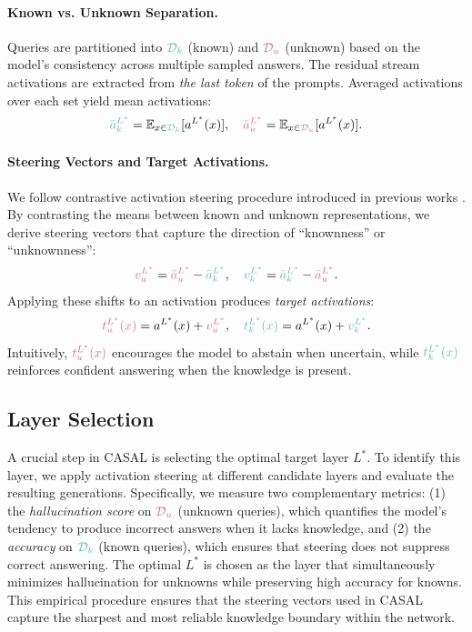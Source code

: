 \documentclass{article} %
\newcommand{\known}[1]{\textcolor{KnownGreen}{#1}}
\newcommand{\unknown}[1]{\textcolor{UnknownRed}{#1}}
\begin{document}
\paragraph{Known vs. Unknown Separation.}  
Queries are partitioned into $\known{\mathcal{D}_k}$ (\known{known}) and $\unknown{\mathcal{D}_u}$ (\unknown{unknown}) based on the model’s consistency across multiple sampled answers. The residual stream activations are extracted from \textit{the last token} of the prompts. Averaged activations over each set yield mean activations:
\[
\known{\bar{a}^{L^*}_k} = \mathbb{E}_{x \in \known{\mathcal{D}_k}}[a^{L^*}(x)], \quad 
\unknown{\bar{a}^{L^*}_u} = \mathbb{E}_{x \in \unknown{\mathcal{D}_u}}[a^{L^*}(x)] .
\]  

\paragraph{Steering Vectors and Target Activations.}  
\label{para: steering and target}
We follow contrastive activation steering procedure introduced in previous works \citep{arditi2024refusal}. By contrasting the means between known and unknown representations, we derive steering vectors that capture the direction of \known{``knownness''} or \unknown{``unknownness''}:
\[
\unknown{v^{L^*}_u} = \unknown{\bar{a}^{L^*}_u} - \known{\bar{a}^{L^*}_k}, \quad 
\known{v^{L^*}_k} = \known{\bar{a}^{L^*}_k} - \unknown{\bar{a}^{L^*}_u}.
\]
Applying these shifts to an activation produces \emph{target activations}:
\[
\unknown{t^{L^*}_u(x)} = a^{L^*}(x) + \unknown{v^{L^*}_u}, \quad 
\known{t^{L^*}_k(x)} = a^{L^*}(x) + \known{v^{L^*}_k}.
\]  
Intuitively, $\unknown{t^{L^*}_u(x)}$ encourages the model to abstain when uncertain, while $\known{t^{L^*}_k(x)}$ reinforces confident answering when the knowledge is present.  

\subsection{Layer Selection}
\label{app:select_layer}

A crucial step in CASAL is selecting the optimal target layer $L^*$. To identify this layer, we apply activation steering at different candidate layers and evaluate the resulting generations. Specifically, we measure two complementary metrics: (1) the \emph{hallucination score} on $\unknown{\mathcal{D}_u}$ (\unknown{unknown} queries), which quantifies the model’s tendency to produce incorrect answers when it lacks knowledge, and (2) the \emph{accuracy} on $\known{\mathcal{D}_k}$ (\known{known} queries), which ensures that steering does not suppress correct answering. The optimal $L^*$ is chosen as the layer that simultaneously minimizes hallucination for unknowns while preserving high accuracy for knowns. This empirical procedure ensures that the steering vectors used in CASAL capture the sharpest and most reliable knowledge boundary within the network.  
\end{document}
